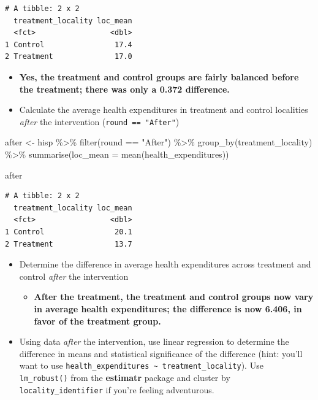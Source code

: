 \documentclass[
  letterpaper,
  DIV=11,
  numbers=noendperiod]{scrartcl}
\newenvironment{Shaded}{\begin{snugshade}}{\end{snugshade}}
\newcommand{\AttributeTok}[1]{\textcolor[rgb]{0.40,0.45,0.13}{#1}}
\newcommand{\FunctionTok}[1]{\textcolor[rgb]{0.28,0.35,0.67}{#1}}
\newcommand{\NormalTok}[1]{\textcolor[rgb]{0.00,0.23,0.31}{#1}}
\newcommand{\OtherTok}[1]{\textcolor[rgb]{0.00,0.23,0.31}{#1}}
\newcommand{\SpecialCharTok}[1]{\textcolor[rgb]{0.37,0.37,0.37}{#1}}
\newcommand{\StringTok}[1]{\textcolor[rgb]{0.13,0.47,0.30}{#1}}
\providecommand{\tightlist}{%
  \setlength{\itemsep}{0pt}\setlength{\parskip}{0pt}}\usepackage{longtable,booktabs,array}
\begin{document}
\begin{verbatim}
# A tibble: 2 x 2
  treatment_locality loc_mean
  <fct>                 <dbl>
1 Control                17.4
2 Treatment              17.0
\end{verbatim}

\begin{itemize}
\item
  \textbf{Yes, the treatment and control groups are fairly balanced
  before the treatment; there was only a 0.372 difference.}
\item
  Calculate the average health expenditures in treatment and control
  localities \emph{after} the intervention (\texttt{round\ ==\ "After"})
\end{itemize}

\begin{Shaded}
\begin{Highlighting}[numbers=left,,]
\NormalTok{after }\OtherTok{\textless{}{-}}\NormalTok{ hisp }\SpecialCharTok{\%\textgreater{}\%} 
  \FunctionTok{filter}\NormalTok{(round }\SpecialCharTok{==} \StringTok{"After"}\NormalTok{) }\SpecialCharTok{\%\textgreater{}\%} 
  \FunctionTok{group\_by}\NormalTok{(treatment\_locality) }\SpecialCharTok{\%\textgreater{}\%} 
  \FunctionTok{summarise}\NormalTok{(}\AttributeTok{loc\_mean =} \FunctionTok{mean}\NormalTok{(health\_expenditures))}

\NormalTok{after}
\end{Highlighting}
\end{Shaded}

\begin{verbatim}
# A tibble: 2 x 2
  treatment_locality loc_mean
  <fct>                 <dbl>
1 Control                20.1
2 Treatment              13.7
\end{verbatim}

\begin{itemize}
\tightlist
\item
  Determine the difference in average health expenditures across
  treatment and control \emph{after} the intervention

  \begin{itemize}
  \tightlist
  \item
    \textbf{After the treatment, the treatment and control groups now
    vary in average health expenditures; the difference is now 6.406, in
    favor of the treatment group.}
  \end{itemize}
\item
  Using data \emph{after} the intervention, use linear regression to
  determine the difference in means and statistical significance of the
  difference (hint: you'll want to use
  \texttt{health\_expenditures\ \textasciitilde{}\ treatment\_locality}).
  Use \texttt{lm\_robust()} from the \textbf{estimatr} package and
  cluster by \texttt{locality\_identifier} if you're feeling
  adventurous.
\end{itemize}
\end{document}
